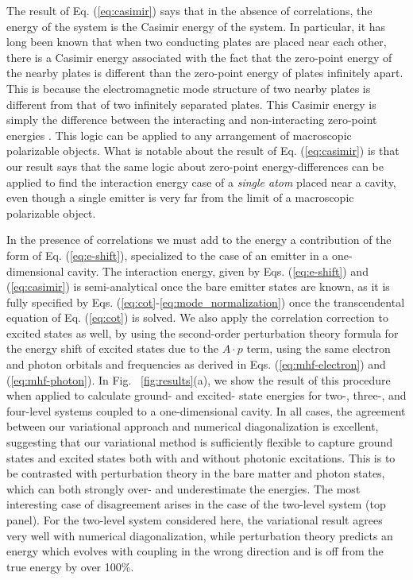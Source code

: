 \documentclass[aps,prl,twocolumn,
	groupedaddress,superscriptaddress,
	amsfonts,amssymb,amsmath,floatfix,
	citeautoscript]{revtex4-1}
\begin{document}
The result of Eq. (\ref{eq:casimir})  says that in the absence of correlations, the energy of the system is the Casimir energy of the system. In particular, it has long been known that when two conducting plates are placed near each other, there is a Casimir energy associated with the fact that the zero-point energy of the nearby plates is different than the zero-point energy of plates infinitely apart. This is because the electromagnetic mode structure of two nearby plates is different from that of two infinitely separated plates. This Casimir energy is simply the difference between the interacting and non-interacting zero-point energies \cite{casimir1948attraction,lifshitz1956theory}. This logic can be applied to any arrangement of macroscopic polarizable objects. What is notable about the result of Eq. (\ref{eq:casimir}) is that our result says that the same logic about zero-point energy-differences can be applied to find the interaction energy case of a \textit{single atom} placed near a cavity, even though a single emitter is very far from the limit of a macroscopic polarizable object. 

In the presence of correlations  we must add to the energy a contribution of the form of Eq. (\ref{eq:e-shift}), specialized to the case of an emitter in a one-dimensional cavity. The interaction energy, given by Eqs. (\ref{eq:e-shift}) and (\ref{eq:casimir}) is semi-analytical once the bare emitter states are known, as it is fully specified by Eqs. (\ref{eq:cot}-\ref{eq:mode_normalization}) once the transcendental equation of Eq. (\ref{eq:cot}) is solved. We also apply the correlation correction to excited states as well, by using the second-order perturbation theory formula for the energy shift of excited states due to the $A \cdot p$ term, using the same electron and photon orbitals and frequencies as derived in Eqs. (\ref{eq:mhf-electron}) and (\ref{eq:mhf-photon}). In Fig. ~\ref{fig:results}(a), we show the result of this procedure when applied to calculate ground- and excited- state energies for two-, three-, and four-level systems coupled to a one-dimensional cavity. In all cases, the agreement between our variational approach and numerical diagonalization is excellent, suggesting that our variational method is sufficiently flexible to capture ground states and excited states both with and without photonic excitations. This is to be contrasted with perturbation theory in the bare matter and photon states, which can both strongly over- and underestimate the energies. The most interesting case of disagreement arises in the case of the two-level system (top panel). For the two-level system considered here, the variational result agrees very well with numerical diagonalization, while perturbation theory predicts an energy which evolves with coupling in the wrong direction and is off from the true energy by over 100\%.
\end{document}
